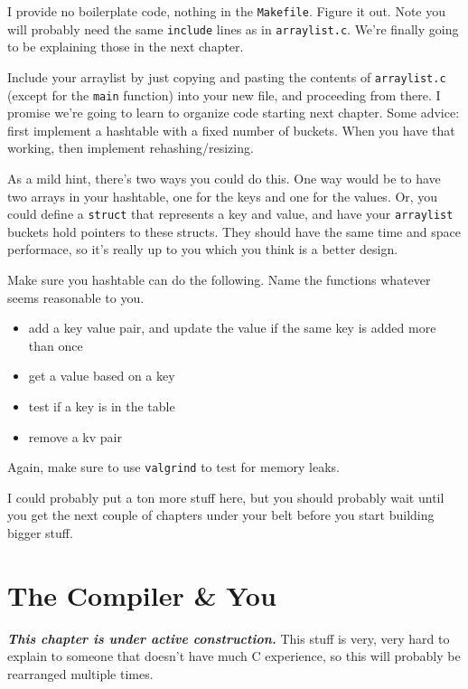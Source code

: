 \documentclass[ebook,11pt,oneside,openany]{memoir}
\newcommand{\cf}[1]{\texttt{#1}}
\begin{document}
\begin{enumerate}
I provide no boilerplate code, nothing in the \cf{Makefile}. Figure it out. Note you will probably need the same \cf{include} lines as in \cf{arraylist.c}. We're finally going to be explaining those in the next chapter.

Include your arraylist by just copying and pasting the contents of \cf{arraylist.c} (except for the \cf{main} function) into your new file, and proceeding from there. I promise we're going to learn to organize code starting next chapter. Some advice: first implement a hashtable with a fixed number of buckets. When you have that working, then implement rehashing/resizing.

As a mild hint, there's two ways you could do this. One way would be to have two arrays in your hashtable, one for the keys and one for the values. Or, you could define a \cf{struct} that represents a key and value, and have your \cf{arraylist} buckets hold pointers to these structs. They should have the same time and space performace, so it's really up to you which you think is a better design.

Make sure you hashtable can do the following. Name the functions whatever seems reasonable to you.

\begin{itemize}
\item add a key value pair, and update the value if the same key is added more than once
\item get a value based on a key
\item test if a key is in the table
\item remove a kv pair
\end{itemize}


Again, make sure to use \cf{valgrind} to test for memory leaks.

\end{enumerate}

\noindent
I could probably put a ton more stuff here, but you should probably wait until you get the next couple of chapters under your belt before you start building bigger stuff.

\chapter{The Compiler \& You}
\label{ch:compiler}
\textbf{\textit{This chapter is under active construction.}} This stuff is very, very hard to explain to someone that doesn't have much C experience, so this will probably be rearranged multiple times.
\end{document}
